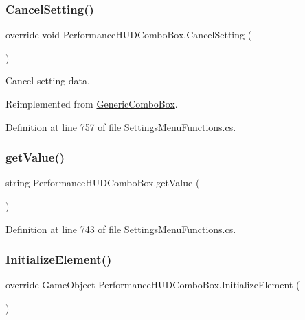 \subsubsection{\texorpdfstring{Cancel\+Setting()}{CancelSetting()}}
{\footnotesize\ttfamily override void Performance\+H\+U\+D\+Combo\+Box.\+Cancel\+Setting (\begin{DoxyParamCaption}{ }\end{DoxyParamCaption})\hspace{0.3cm}{\ttfamily [virtual]}}



Cancel setting data. 



Reimplemented from \hyperlink{class_generic_combo_box_a0949a84cf1e33d13346cb90597e005ce}{Generic\+Combo\+Box}.



Definition at line 757 of file Settings\+Menu\+Functions.\+cs.

\mbox{\label{class_performance_h_u_d_combo_box_a8441911f9ae0d92799a2f0f2089ea85c}} 
\subsubsection{\texorpdfstring{get\+Value()}{getValue()}}
{\footnotesize\ttfamily string Performance\+H\+U\+D\+Combo\+Box.\+get\+Value (\begin{DoxyParamCaption}{ }\end{DoxyParamCaption})}



Definition at line 743 of file Settings\+Menu\+Functions.\+cs.

\mbox{\label{class_performance_h_u_d_combo_box_a4d2e3c3bb7815cb0274a0d890af92cd0}} 
\subsubsection{\texorpdfstring{Initialize\+Element()}{InitializeElement()}}
{\footnotesize\ttfamily override Game\+Object Performance\+H\+U\+D\+Combo\+Box.\+Initialize\+Element (\begin{DoxyParamCaption}{ }\end{DoxyParamCaption})\hspace{0.3cm}{\ttfamily [virtual]}}



